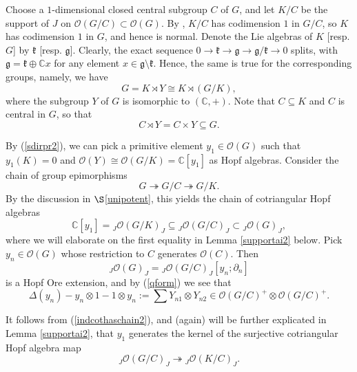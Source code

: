 \documentclass{amsart}
\numberwithin{equation}{section}
\theoremstyle{definition}
\begin{document}
Choose a $1$-dimensional closed central subgroup $C$ of $G$, and let $K/C$ be the support of $J$ on $\mathcal{O}(G/C)\subset \mathcal{O}(G)$. By \cite[Proposition 4.6]{G1}, $K/C $ has codimension $1$ in $G/C$, so $K$ has codimension $1$ in $G$, and hence is normal. Denote the Lie algebras of $K$ [resp. $G$]  by $\mathfrak{k}$ [resp. $\mathfrak{g}$]. Clearly, the exact sequence $0 \rightarrow \mathfrak{k} \rightarrow \mathfrak{g} \rightarrow \mathfrak{g}/\mathfrak{k}\rightarrow 0$ splits, with $\mathfrak{g} = \mathfrak{k} \oplus \mathbb{C}x$ for any element $x \in \mathfrak{g} \setminus \mathfrak{k}$. Hence, the same is true for the corresponding groups, namely, we have
\begin{equation}\label{sdirpr2}
G = K\rtimes Y \cong K\rtimes (G/K),
\end{equation}
where the subgroup $Y$ of $G$ is isomorphic to $(\mathbb{C},+)$. Note that $C  \subseteq  K$ and $C$ is central in $G$, so that 
$$ C\rtimes Y= C \times Y \subseteq G.$$

By (\ref{sdirpr2}), we can pick a primitive element $y_1\in\mathcal{O}(G)$ such that $y_1(K) = 0$ and $\mathcal{O}(Y) \cong \mathcal{O}(G/K)=\mathbb{C}[y_1]$ as Hopf algebras. Consider the chain of group epimorphisms
$$G\twoheadrightarrow G/C\twoheadrightarrow G/K.$$
By the discussion in $\S$\ref{unipotent}, this yields the chain of cotriangular Hopf algebras 
\begin{equation}\label{indcothaschain2}
\mathbb{C}[y_1] = {}_J\mathcal{O}(G/K)_J\subseteq {}_J\mathcal{O}(G/C)_J\subset {}_J\mathcal{O}(G)_J,
\end{equation}
where we will elaborate on the first equality in Lemma \ref{supportai2} below. Pick $y_{n}\in\mathcal{O}(G)$ whose restriction to $C$ generates $\mathcal{O}(C )$. Then
\begin{equation*}\label{oreextyn2}
{}_J\mathcal{O}(G)_J={}_J\mathcal{O}(G/C)_J[y_{n};\partial_{n}]
\end{equation*}
is a Hopf Ore extension, and by (\ref{qform}) we see that
\begin{equation}\label{deltayn2}
\Delta(y_n)-y_n\otimes 1-1\otimes y_n := \sum Y_{n1} \otimes Y_{n2} \in \mathcal{O}(G/C )^+\otimes \mathcal{O}(G/C )^+.
\end{equation}

It follows from (\ref{indcothaschain2}), and (again) will be further explicated in Lemma \ref{supportai2}, that $y_1$ generates the kernel of the surjective cotriangular Hopf algebra map 
\begin{equation}\label{newsurjhom2}
{}_J\mathcal{O}(G/C)_J\twoheadrightarrow {}_J\mathcal{O}(K/C)_J.
\end{equation}
\end{document}
